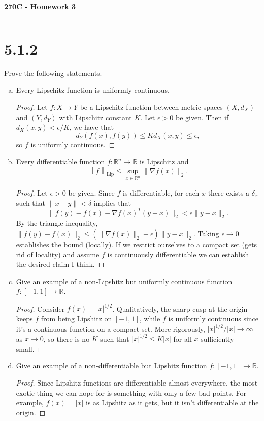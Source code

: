 \documentclass[11pt,letterpaper]{report}
\newcommand{\reals}{\mathbb{R}}
\newcommand{\Lip}[1]{\left\|{#1}\right\|_{\text{Lip}}}
\begin{document}
\begin{center}
{\bf \Large 270C - Homework 3}
\vspace{0.2cm}
\hrule
\end{center}



\section*{5.1.2}
Prove the following statements.
\begin{enumerate}[(a)]
	\item Every Lipschitz function is uniformly continuous.
	\begin{proof}
		Let $f:X\to Y$ be a Lipschitz function between metric spaces $(X, d_X)$ and $(Y, d_Y)$ with Lipschitz constant $K$. Let $\epsilon>0$ be given. Then if $d_X(x,y)<\epsilon/K$, we have that
		\[
		d_Y(f(x), f(y)) \leq Kd_X(x,y) \leq \epsilon,
		\]
		so $f$ is uniformly continuous.
	\end{proof}

	\item Every differentiable function $f: \reals^n\to \reals$ is Lipschitz and
	\[
		\Lip{f}\leq \sup_{x\in \reals^n}\|\nabla f(x)\|_2.
	\]
	\begin{proof}
		Let $\epsilon>0$ be given. Since $f$ is differentiable, for each $x$ there exists a $\delta_x$ such that $\|x-y\|<\delta$ implies that
		\[
		\|f(y)-f(x)-\nabla f(x)^T(y-x)\|_2 <\epsilon\|y-x\|_2.
		\]
		By the triangle inequality, $\|f(y)-f(x)\|_2 \leq (\|\nabla f(x)\|_2 + \epsilon)\|y-x\|_2$. Taking $\epsilon\to 0$ establishes the bound (locally). If we restrict ourselves to a compact set (gets rid of locality) and assume $f$ is continuously differentiable we can establish the desired claim I think.
	\end{proof}

	\item Give an example of a non-Lipshitz but uniformly continuous function $f:[-1,1]\to \reals$.
	\begin{proof}
		Consider $f(x) = |x|^{1/2}$. Qualitatively, the sharp cusp at the origin keeps $f$ from being Lipshitz on $[-1, 1]$, while $f$ is uniformly continuous since it's a continuous function on a compact set. More rigorously, $|x|^{1/2}/|x| \to \infty$ as $x\to 0$, so there is no $K$ such that $|x|^{1/2}\leq K|x|$ for all $x$ sufficiently small.
	\end{proof}


	\item Give an example of a non-differentiable but Lipshitz function $f:[-1, 1]\to \reals$.
	\begin{proof}
		Since Lipshitz functions are differentiable almost everywhere, the most exotic thing we can hope for is something with only a few bad points. For example, $f(x) = |x|$ is as Lipshitz as it gets, but it isn't differentiable at the origin.
	\end{proof}
\end{enumerate}
\end{document}
